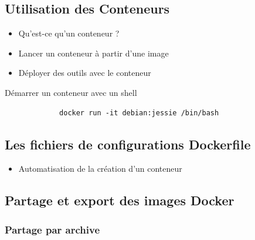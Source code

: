 \documentclass{beamer}
\begin{document}
    \subsection{Utilisation des Conteneurs}
    \begin{frame}[containsverbatim]
       \begin{itemize}
          \item{Qu'est-ce qu'un conteneur ?}
          \item{Lancer un conteneur à partir d'une image}
          \item{Déployer des outils avec le conteneur}
       \end{itemize}
     
       \begin{exampleblock}{Démarrer un conteneur avec un shell}
          \begin{verbatim}
             docker run -it debian:jessie /bin/bash
          \end{verbatim}
       \end{exampleblock}
    \end{frame}

    \subsection{Les fichiers de configurations Dockerfile}
    \begin{frame}
       \begin{itemize}
          \item{Automatisation de la création d'un conteneur}
          
       \end{itemize}
    \end{frame}

    \subsection{Partage et export des images Docker}
    \begin{frame}
    \end{frame}

    \subsubsection{Partage par archive}
    \begin{frame}
    \end{frame}
\end{document}
